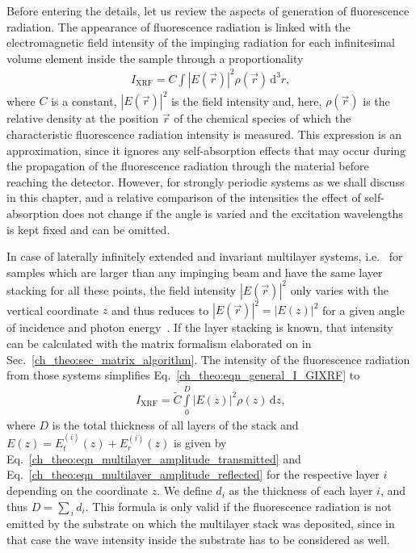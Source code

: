 Before entering the details, let us review the aspects of generation of fluorescence radiation. The appearance of fluorescence radiation is linked with the electromagnetic field intensity of the impinging radiation for each infinitesimal volume element inside the sample through a proportionality
\begin{align}
 I_\text{XRF} = C \int |E(\vec{r})|^2 \rho(\vec{r}) 
\,\text{d}^3 r \text{,} \label{ch_theo:eqn_general_I_GIXRF}
\end{align}
where $C$ is a constant, $|E(\vec{r})|^2$ is the field intensity and, here, $\rho(\vec{r})$ is the relative density at the position $\vec{r}$ of the chemical species of which the characteristic fluorescence radiation intensity is measured. This expression is an approximation, since it ignores any self-absorption effects that may occur during the propagation of the fluorescence radiation through the material before reaching the detector. However, for strongly periodic systems as we shall discuss in this chapter, and a relative comparison of the intensities the effect of self-absorption does not change if the angle is varied and the excitation wavelengths is kept fixed and can be omitted.


In case of laterally infinitely extended and invariant multilayer systems, i.e.~ for samples which are larger than any impinging beam and have the same layer stacking for all these points, the field intensity $|E(\vec{r})|^2$ only varies with the vertical coordinate $z$ and thus reduces to $|E(\vec{r})|^2 = |E(z)|^2$ for a given angle of incidence and photon energy~\cite{de_boer_glancing-incidence_1991}. If the layer stacking is known, that intensity can be calculated with the matrix formalism elaborated on in Sec.~\ref{ch_theo:sec_matrix_algorithm}. The intensity of the fluorescence radiation from those systems simplifies Eq.~\eqref{ch_theo:eqn_general_I_GIXRF} to 
\begin{align}
 I_\text{XRF} = \tilde{C} \int\limits_0^{D} |E(z)|^2 \rho(z) 
\,\text{d}z \text{,} \label{ch_theo:eqn_I_GIXRF_multilayer}
\end{align}
where $D$ is the total thickness of all layers of the stack and $E(z) = E^{(i)}_t(z) + E^{(i)}_r(z)$ is given by Eq.~\eqref{ch_theo:eqn_multilayer_amplitude_transmitted} and Eq.~\eqref{ch_theo:eqn_multilayer_amplitude_reflected} for the respective layer $i$ depending on the coordinate $z$. We define $d_i$ as the thickness of each layer $i$, and thus $D = \sum_{\,i} d_i$. This formula is only valid if the fluorescence radiation is not emitted by the substrate on which the multilayer stack was deposited, since in that case the wave intensity inside the substrate has to be considered as well.

